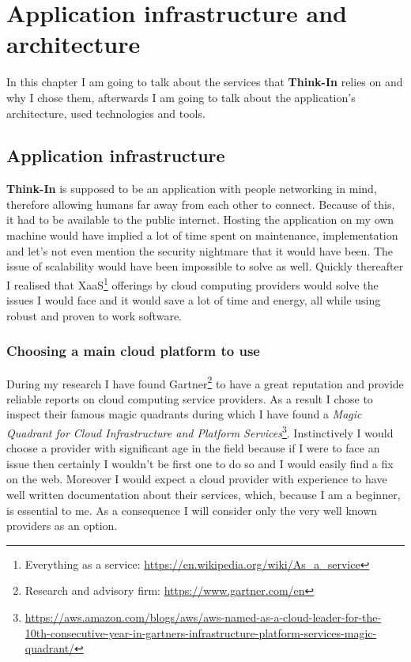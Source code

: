 \chapter{Application infrastructure and architecture}

In this chapter I am going to talk about the services that \textbf{Think-In} relies on and why I chose them, afterwards I am going to talk about the application's architecture, used technologies and tools.

\section{Application infrastructure}

\textbf{Think-In} is supposed to be an application with people networking in mind, therefore allowing humans far away from each other to connect. Because of this, it had to be available to the public internet. Hosting the application on my own machine would have implied a lot of time spent on maintenance, implementation and let's not even mention the security nightmare that it would have been. The issue of scalability would have been impossible to solve as well. Quickly thereafter I realised that XaaS\footnote{Everything as a service: \href{https://en.wikipedia.org/wiki/As\_a\_service}{https://en.wikipedia.org/wiki/As\_a\_service}} offerings by cloud computing providers would solve the issues I would face and it would save a lot of time and energy, all while using robust and proven to work software.

\subsection{Choosing a main cloud platform to use}

During my research I have found Gartner\footnote{Research and advisory firm: \href{https://www.gartner.com/en}{https://www.gartner.com/en}} to have a great reputation and provide reliable reports on cloud computing service providers. As a result I chose to inspect their famous magic quadrants during which I have found a \textit{Magic Quadrant for Cloud Infrastructure and Platform Services}\footnote{\href{https://aws.amazon.com/blogs/aws/aws-named-as-a-cloud-leader-for-the-10th-consecutive-year-in-gartners-infrastructure-platform-services-magic-quadrant/}{https://aws.amazon.com/blogs/aws/aws-named-as-a-cloud-leader-for-the-10th-consecutive-year-in-gartners-infrastructure-platform-services-magic-quadrant/}}. Instinctively I would choose a provider with significant age in the field because if I were to face an issue then certainly I wouldn't be first one to do so and I would easily find a fix on the web. Moreover I would expect a cloud provider with experience to have well written documentation about their services, which, because I am a beginner, is essential to me. As a consequence I will consider only the very well known providers as an option.


